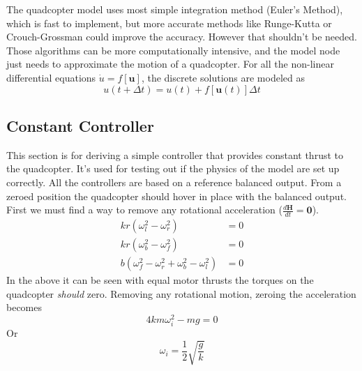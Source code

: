 \documentclass[lettersize,journal]{IEEEtran}
\begin{document}
The quadcopter model uses most simple integration method (Euler's Method), which is fast to implement, but more accurate methods like Runge-Kutta or Crouch-Grossman could improve the accuracy.
However that shouldn't be needed.
Those algorithms can be more computationally intensive, and the model node just needs to approximate the motion of a quadcopter.
For all the non-linear differential equations $\dot{u}=f\left[\mathbf{u}\right]$, the discrete solutions are modeled as
\begin{equation}
  u\left(t+\Delta t\right) = u\left(t\right) + f\left[\mathbf{u}\left(t\right)\right]\Delta t
\end{equation}
\subsection{Constant Controller}
This section is for deriving a simple controller that provides constant thrust to the quadcopter. It's used for testing out if the physics of the model are set up correctly. All the controllers are based on a reference balanced output. From a zeroed position the quadcopter should hover in place with the balanced output. First we must find a way to remove any rotational acceleration ($\frac{d\mathbf{H}}{dt} = \mathbf{0}$). 
\begin{align}
  kr\left(\omega_l^2-\omega_r^2\right) &= 0 \nonumber \\
  kr\left(\omega_b^2-\omega_f^2\right) &= 0\nonumber \\
  b\left(\omega_f^2-\omega_r^2 + \omega_b^2 - \omega_l^2\right) &= 0 \nonumber
\end{align}
In the above it can be seen with equal motor thrusts the torques on the quadcopter \emph{should} zero. Removing any rotational motion, zeroing the acceleration becomes
\begin{equation}
  4km\omega_i^2 -mg = 0 \nonumber
\end{equation}
Or
\begin{equation}
  \omega_i = \frac{1}{2}\sqrt{\frac{g}{k}}
\end{equation}
\end{document}
